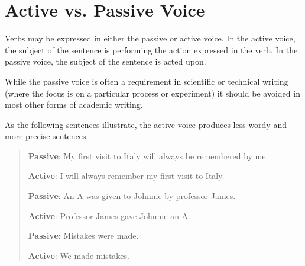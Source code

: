 
\chapter{Active vs. Passive Voice}

Verbs may be expressed in either the passive or active voice. In the active voice, the subject of the sentence is performing the action expressed in the verb. In the passive voice, the subject of the sentence is acted upon. 

While the passive voice is often a requirement in scientific or technical writing (where 
the focus is on a particular process or experiment) it should be avoided in most other forms of academic writing. 

As the following sentences illustrate, the active voice 
produces less wordy and more precise sentences:

\begin{quote}
\textbf{Passive}: My first visit to Italy will always be remembered by me.

\textbf{Active}: I will always remember my first visit to Italy.

\medskip

\textbf{Passive}: 	An A was given to Johnnie by professor James.

\textbf{Active}: 	Professor James gave Johnnie an A.

\medskip

\textbf{Passive}: Mistakes were made.

\textbf{Active}: We made mistakes.

\end{quote}

